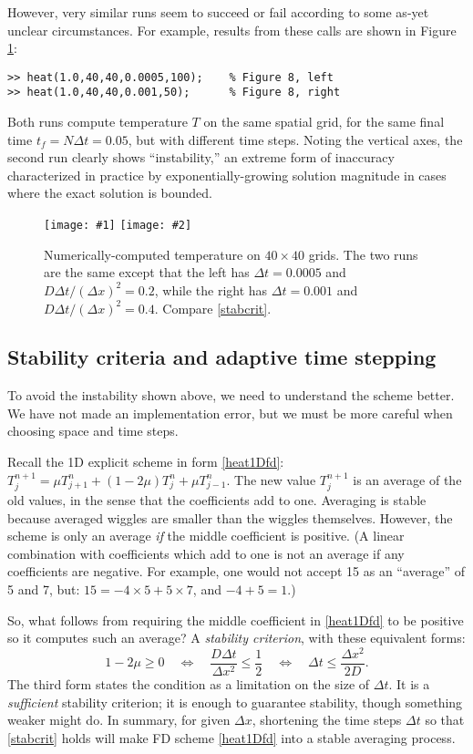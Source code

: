 \documentclass[letterpaper,final,12pt,reqno]{amsart}
\newcommand{\minput}[1]{
\vspace{0.8cm}
\VerbatimInput[frame=single,framesep=3mm,label=\fbox{\normalsize \textsl{\,#1.m\,}},fontfamily=courier,fontsize=\footnotesize]{tmp/#1.slim.m}
\vspace{0.5cm}
}
\newcommand{\twofigsizes}[5]{
\begin{figure}[ht]
\centering
\texttt{[image: \#1]} \quad
\texttt{[image: \#2]}
\caption{#3}
\label{fig:#1}
\end{figure}}
\newcommand{\twofig}[3]{\twofigsizes{#1}{#2}{#3}{2.5in}{2.5in}}
\begin{document}
\minput{heat}

However, very similar runs seem to succeed or fail according to some as-yet unclear circumstances.  For example, results from these calls are shown in Figure \ref{fig:stability}:
\begin{Verbatim}
>> heat(1.0,40,40,0.0005,100);    % Figure 8, left
>> heat(1.0,40,40,0.001,50);      % Figure 8, right
\end{Verbatim}
Both runs compute temperature $T$ on the same spatial grid, for the same final time $t_f = N \Delta t = 0.05$, but with different time steps.  Noting the vertical axes, the second run clearly shows ``instability,'' an extreme form of inaccuracy characterized in practice by exponentially-growing solution magnitude in cases where the exact solution is bounded.

\twofig{stability}{instability}{Numerically-computed temperature on $40\times 40$ grids.  The two runs are the same except that the left has $\Delta t=0.0005$ and $D\Delta t/(\Delta x)^2= 0.2$, while the right has $\Delta t=0.001$ and $D\Delta t/(\Delta x)^2= 0.4$.  Compare \eqref{stabcrit}.}

\subsection*{Stability criteria and adaptive time stepping}  To avoid the instability shown above, we need to understand the scheme better.  We have not made an implementation error, but we must be more careful when choosing space and time steps.

Recall the 1D explicit scheme in form \eqref{heat1Dfd}: $T_j^{n+1} = \mu T_{j+1}^n + (1 - 2 \mu) T_j^n + \mu T_{j-1}^n$.  The new value $T_j^{n+1}$ is an average of the old values, in the sense that the coefficients add to one.  Averaging is stable because averaged wiggles are smaller than the wiggles themselves.  However, the scheme is only an average \emph{if} the middle coefficient is positive.  (A linear combination with coefficients which add to one is not an average if any coefficients are negative.  For example, one would not accept 15 as an ``average'' of 5 and 7, but: $15 = -4 \times 5 + 5 \times 7$, and $-4+5=1$.)

So, what follows from requiring the middle coefficient in \eqref{heat1Dfd} to be positive so it computes such an average?  A \emph{stability criterion}, with these equivalent forms:
\begin{equation}
   1 - 2 \mu \ge 0 \quad \iff \quad \frac{D\Delta t}{\Delta x^2} \le \frac{1}{2} \quad \iff \quad \Delta t \le \frac{\Delta x^2}{2 D}.  \label{stabcrit}
\end{equation}
The third form states the condition as a limitation on the size of $\Delta t$.  It is a \emph{sufficient} stability criterion; it is enough to guarantee stability, though something weaker might do.  In summary, for given $\Delta x$, shortening the time steps $\Delta t$ so that \eqref{stabcrit} holds will make FD scheme \eqref{heat1Dfd} into a stable averaging process.
\end{document}
